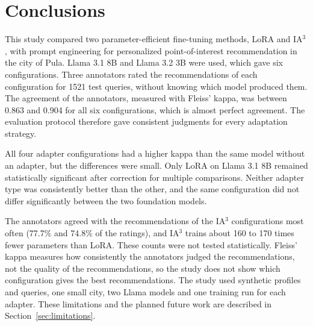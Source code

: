 \documentclass[journal,article,submit,pdftex,moreauthors]{Definitions/mdpi}
\begin{document}
\section{Conclusions}

This study compared two parameter-efficient fine-tuning methods, LoRA and IA$^3$, with prompt engineering for personalized point-of-interest recommendation in the city of Pula. Llama 3.1 8B and Llama 3.2 3B were used, which gave six configurations. Three annotators rated the recommendations of each configuration for 1521 test queries, without knowing which model produced them. The agreement of the annotators, measured with Fleiss' kappa, was between 0.863 and 0.904 for all six configurations, which is almost perfect agreement. The evaluation protocol therefore gave consistent judgments for every adaptation strategy.

All four adapter configurations had a higher kappa than the same model without an adapter, but the differences were small. Only LoRA on Llama 3.1 8B remained statistically significant after correction for multiple comparisons. Neither adapter type was consistently better than the other, and the same configuration did not differ significantly between the two foundation models.

The annotators agreed with the recommendations of the IA$^3$ configurations most often (77.7\% and 74.8\% of the ratings), and IA$^3$ trains about 160 to 170 times fewer parameters than LoRA. These counts were not tested statistically. Fleiss' kappa measures how consistently the annotators judged the recommendations, not the quality of the recommendations, so the study does not show which configuration gives the best recommendations. The study used synthetic profiles and queries, one small city, two Llama models and one training run for each adapter. These limitations and the planned future work are described in Section~\ref{sec:limitations}.

\vspace{6pt} 


\end{document}
